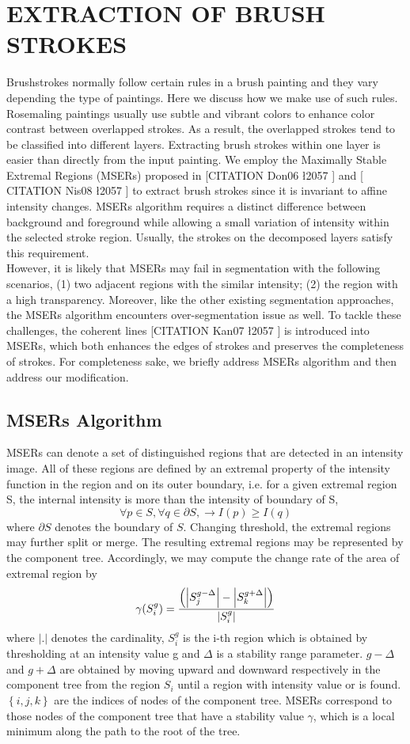 \section{EXTRACTION OF BRUSH STROKES}
Brushstrokes normally follow certain rules in a brush painting and they vary depending the type of paintings. Here we discuss how we make use of such rules. Rosemaling paintings usually use subtle and vibrant colors to enhance color contrast between overlapped strokes. As a result, the overlapped strokes tend to be classified into different layers. Extracting brush strokes within one layer is easier than directly from the input painting. We employ the Maximally Stable Extremal Regions (MSERs) proposed in [CITATION Don06 \l 2057 ] and [ CITATION Nis08 \l 2057 ] to extract brush strokes since it is invariant to affine intensity changes. MSERs algorithm requires a distinct difference between background and foreground while allowing a small variation of intensity within the selected stroke region. Usually, the strokes on the decomposed layers satisfy this requirement.\\
However, it is likely that MSERs may fail in segmentation with the following scenarios, (1) two adjacent regions with the similar intensity; (2) the region with a high transparency. Moreover, like the other existing segmentation approaches, the MSERs algorithm encounters over-segmentation issue as well. To tackle these challenges, the coherent lines [CITATION Kan07 \l 2057 ] is introduced into MSERs, which both enhances the edges of strokes and preserves the completeness of strokes. For completeness sake, we briefly address MSERs algorithm and then address our modification.
\subsection{MSERs Algorithm}
MSERs can denote a set of distinguished regions that are detected in an intensity image. All of these regions are defined by an extremal property of the intensity function in the region and on its outer boundary, i.e. for a given extremal region S, the internal intensity is more than the intensity of boundary of S,
\[ \forall p \in S,\forall q \in \partial S , \longrightarrow I(p) \geq I(q)\]
where $\partial S $ denotes the boundary of $S$.
Changing threshold, the extremal regions may further split or merge. The resulting extremal regions may be represented by the component tree. Accordingly, we may compute the change rate of the area of extremal region by
\[ \gamma(S_i^g) = \frac{\left ( \left |  S_j^{g-\Delta} \right |-\left |  S_k^{g+\Delta} \right | \right )}{\arrowvert S_i^g\arrowvert} \] 
where $ \left | .  \right |$  denotes the cardinality, $ S_{i}^{g} $  is the i-th region which is obtained by thresholding at an intensity value g and $\Delta $ is a stability range parameter. $  g-\Delta $ and $ g+\Delta $ are obtained by moving upward and downward respectively in the component tree from the region $ S_{i} $ until a region with intensity value   or  is found. $ \left \{ i,j,k \right \}$ are the indices of nodes of the component tree. MSERs correspond to those nodes of the component tree that have a stability value $\gamma$, which is a local minimum along the path to the root of the tree.
